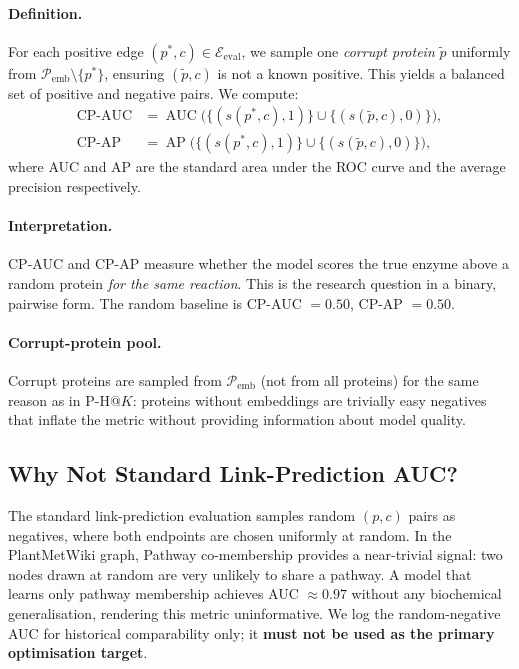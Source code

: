 \paragraph{Definition.}
For each positive edge $(p^*, c) \in \mathcal{E}_\text{eval}$, we sample one
\emph{corrupt protein} $\tilde{p}$ uniformly from $\mathcal{P}_\text{emb}
\setminus \{p^* \}$, ensuring $(\tilde{p}, c)$ is not a known positive.
This yields a balanced set of positive and negative pairs.
We compute:
\begin{align}
  \text{CP-AUC} &= \operatorname{AUC}\bigl(
    \{(s(p^*, c), 1)\} \cup \{(s(\tilde{p}, c), 0)\}
  \bigr), \\
  \text{CP-AP}  &= \operatorname{AP}\bigl(
    \{(s(p^*, c), 1)\} \cup \{(s(\tilde{p}, c), 0)\}
  \bigr),
\end{align}
where AUC and AP are the standard area under the ROC curve and the
average precision respectively.

\paragraph{Interpretation.}
CP-AUC and CP-AP measure whether the model scores the true enzyme above a
random protein \emph{for the same reaction}.
This is the research question in a binary, pairwise form.
The random baseline is CP-AUC $= 0.50$, CP-AP $= 0.50$.

\paragraph{Corrupt-protein pool.}
Corrupt proteins are sampled from $\mathcal{P}_\text{emb}$ (not from all proteins)
for the same reason as in P-H@$K$: proteins without embeddings are trivially
easy negatives that inflate the metric without providing information about
model quality.

\subsection{Why Not Standard Link-Prediction AUC?}

The standard link-prediction evaluation samples random $(p, c)$ pairs as
negatives, where both endpoints are chosen uniformly at random.
In the PlantMetWiki graph, Pathway co-membership provides a near-trivial
signal: two nodes drawn at random are very unlikely to share a pathway.
A model that learns only pathway membership achieves AUC $\approx 0.97$
without any biochemical generalisation, rendering this metric uninformative.
We log the random-negative AUC for historical comparability only; it
\textbf{must not be used as the primary optimisation target}.


